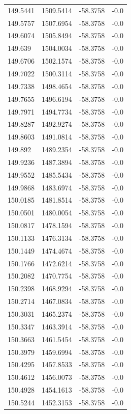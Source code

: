 \begin{table}[H]
\begin{tabular}{llll}
149.5441 & 1509.5414 & -58.3758 & -0.0 \\
149.5757 & 1507.6954 & -58.3758 & -0.0 \\
149.6074 & 1505.8494 & -58.3758 & -0.0 \\
149.639 & 1504.0034 & -58.3758 & -0.0 \\
149.6706 & 1502.1574 & -58.3758 & -0.0 \\
149.7022 & 1500.3114 & -58.3758 & -0.0 \\
149.7338 & 1498.4654 & -58.3758 & -0.0 \\
149.7655 & 1496.6194 & -58.3758 & -0.0 \\
149.7971 & 1494.7734 & -58.3758 & -0.0 \\
149.8287 & 1492.9274 & -58.3758 & -0.0 \\
149.8603 & 1491.0814 & -58.3758 & -0.0 \\
149.892 & 1489.2354 & -58.3758 & -0.0 \\
149.9236 & 1487.3894 & -58.3758 & -0.0 \\
149.9552 & 1485.5434 & -58.3758 & -0.0 \\
149.9868 & 1483.6974 & -58.3758 & -0.0 \\
150.0185 & 1481.8514 & -58.3758 & -0.0 \\
150.0501 & 1480.0054 & -58.3758 & -0.0 \\
150.0817 & 1478.1594 & -58.3758 & -0.0 \\
150.1133 & 1476.3134 & -58.3758 & -0.0 \\
150.1449 & 1474.4674 & -58.3758 & -0.0 \\
150.1766 & 1472.6214 & -58.3758 & -0.0 \\
150.2082 & 1470.7754 & -58.3758 & -0.0 \\
150.2398 & 1468.9294 & -58.3758 & -0.0 \\
150.2714 & 1467.0834 & -58.3758 & -0.0 \\
150.3031 & 1465.2374 & -58.3758 & -0.0 \\
150.3347 & 1463.3914 & -58.3758 & -0.0 \\
150.3663 & 1461.5454 & -58.3758 & -0.0 \\
150.3979 & 1459.6994 & -58.3758 & -0.0 \\
150.4295 & 1457.8533 & -58.3758 & -0.0 \\
150.4612 & 1456.0073 & -58.3758 & -0.0 \\
150.4928 & 1454.1613 & -58.3758 & -0.0 \\
150.5244 & 1452.3153 & -58.3758 & -0.0 \\

\end{tabular}
\end{table}
